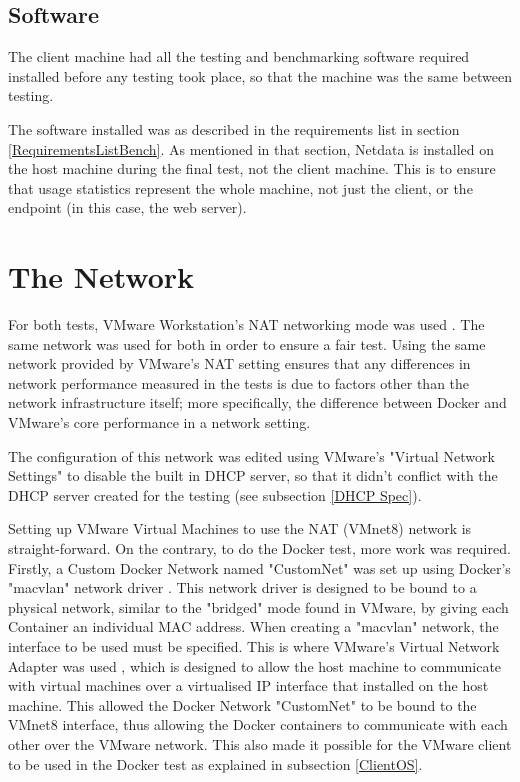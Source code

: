 \subsection{Software}
The client machine had all the testing and benchmarking software required installed before any testing took place, so that the machine was the same between testing.

The software installed was as described in the requirements list in section \ref{RequirementsListBench}. As mentioned in that section, Netdata is installed on the host machine during the final test, not the client machine. This is to ensure that usage statistics represent the whole machine, not just the client, or the endpoint (in this case, the web server).

\section{The Network}
For both tests, VMware Workstation's NAT networking mode was used \citep{VMwareNAT}. The same network was used for both in order to ensure a fair test. Using the same network provided by VMware's NAT setting ensures that any differences in network performance measured in the tests is due to factors other than the network infrastructure itself; more specifically, the difference between Docker and VMware's core performance in a network setting.

The configuration of this network was edited using VMware's "Virtual Network Settings" \citep{VMwareNetChange} to disable the built in DHCP server, so that it didn't conflict with the DHCP server created for the testing (see subsection \ref{DHCP Spec}).

Setting up VMware Virtual Machines to use the NAT (VMnet8) network is straight-forward. On the contrary, to do the Docker test, more work was required. Firstly, a Custom Docker Network named "CustomNet" was set up using Docker's "macvlan" network driver \citep{DockerMacVlan}. This network driver is designed to be bound to a physical network, similar to the "bridged" mode found in VMware, by giving each Container an individual MAC address. When creating a "macvlan" network, the interface to be used must be specified. This is where VMware's Virtual Network Adapter was used \citep{VMwareNetworkAdapter}, which is designed to allow the host machine to communicate with virtual machines over a virtualised IP interface that installed on the host machine. This allowed the Docker Network "CustomNet" to be bound to the VMnet8 interface, thus allowing the Docker containers to communicate with each other over the VMware network. This also made it possible for the VMware client to be used in the Docker test as explained in subsection \ref{ClientOS}.

